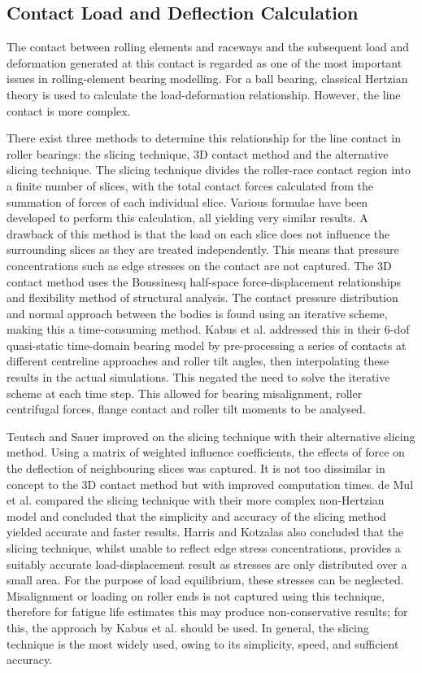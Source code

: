 \subsection{Contact Load and Deflection Calculation}

The contact between rolling elements and raceways and the subsequent load and deformation generated at this contact is regarded as one of the most important issues in rolling-element bearing modelling. For a ball bearing, classical Hertzian theory is used to calculate the load-deformation relationship. However, the line contact is more complex.

There exist three methods to determine this relationship for the line contact in roller bearings: the slicing technique, 3D contact method and the alternative slicing technique. The slicing technique \cite{Andreason1973} divides the roller-race contact region into a finite number of slices, with the total contact forces calculated from the summation of forces of each individual slice. Various formulae have been developed to perform this calculation, all yielding very similar results. A drawback of this method is that the load on each slice does not influence the surrounding slices as they are treated independently. This means that pressure concentrations such as edge stresses on the contact are not captured. The 3D contact method uses the Boussinesq half-space force-displacement relationships and flexibility method of structural analysis. The contact pressure distribution and normal approach between the bodies is found using an iterative scheme, making this a time-consuming method. Kabus et al. \cite{Kabus2012} addressed this in their 6-dof quasi-static time-domain bearing model  by pre-processing a series of contacts at different centreline approaches  and roller tilt angles, then interpolating these results in the actual simulations. This negated the need to solve the iterative scheme at each time step. This allowed for bearing misalignment, roller centrifugal forces, flange contact and roller tilt moments to be analysed. 

Teutsch and Sauer \cite{Teutsch2004} improved on the slicing technique with their alternative slicing method. Using a matrix of weighted influence coefficients, the effects of force on the deflection of neighbouring slices was captured. It is not too dissimilar in concept to the 3D contact method but with improved computation times. de Mul et al. \cite{DeMul1989_2} compared the slicing technique with their more complex non-Hertzian model and concluded that the simplicity and accuracy of the slicing method yielded accurate and faster results. Harris and Kotzalas \cite{Harris2007} also concluded that the slicing technique, whilst unable to reflect edge stress concentrations, provides a suitably accurate load-displacement result as stresses are only distributed over a small area. For the purpose of load equilibrium, these stresses can be neglected. Misalignment or loading on roller ends is not captured using this technique, therefore for fatigue life estimates this may produce non-conservative results; for this, the approach by Kabus et al. should be used. In general, the slicing technique is the most widely used, owing to its simplicity, speed, and sufficient accuracy.

